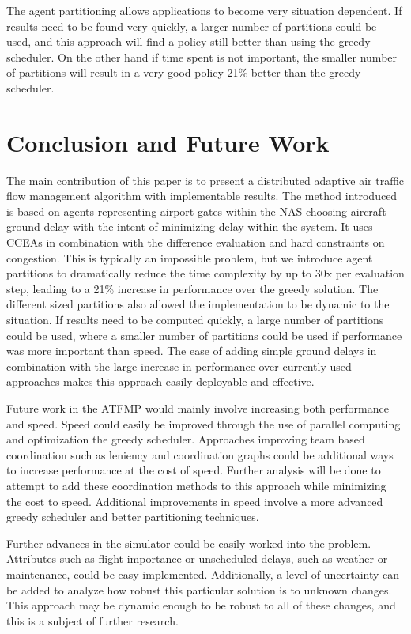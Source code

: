 \documentclass{sig-alternate}
\begin{document}
The agent partitioning allows applications to become very situation dependent. If results need to be found very quickly, a larger number of partitions could be used, and this approach will find a policy still better than using the greedy scheduler. On the other hand if time spent is not important, the smaller number of partitions will result in a very good policy 21\% better than the greedy scheduler. 

\section{Conclusion and Future Work}
The main contribution of this paper is to present a distributed adaptive air traffic flow management algorithm with implementable results. The method introduced is based on agents representing airport gates within the NAS choosing aircraft ground delay with the intent of minimizing delay within the system. It uses CCEAs in combination with the difference evaluation and hard constraints on congestion. This is typically an impossible problem, but we introduce agent partitions to dramatically reduce the time complexity by up to 30x per evaluation step, leading to a 21\% increase in performance over the greedy solution. The different sized partitions also allowed the implementation to be dynamic to the situation. If results need to be computed quickly, a large number of partitions could be used, where a smaller number of partitions could be used if performance was more important than speed. The ease of adding simple ground delays in combination with the large increase in performance over currently used approaches makes this approach easily deployable and effective.

Future work in the ATFMP would mainly involve increasing both performance and speed. Speed could easily be improved through the use of parallel computing and optimization the greedy scheduler. Approaches improving team based coordination such as leniency \cite{Panait} and coordination graphs \cite{Kok:2006:CMR:1248547.1248612,Coordination} could be additional ways to increase performance at the cost of speed. Further analysis will be done to attempt to add these coordination methods to this approach while minimizing the cost to speed. Additional improvements in speed involve a more advanced greedy scheduler and better partitioning techniques.

Further advances in the simulator could be easily worked into the problem. Attributes such as flight importance or unscheduled delays, such as weather or maintenance, could be easy implemented. Additionally, a level of uncertainty can be added to analyze how robust this particular solution is to unknown changes. This approach may be dynamic enough to be robust to all of these changes, and this is a subject of further research.

{}

\end{document}

